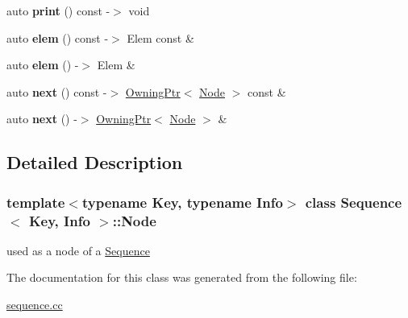 \begin{DoxyCompactItemize}
\item 
\mbox{\label{structSequence_1_1Node_a8db8e48b5cde2ffd9cadb4b89a30d17e}} 
auto {\bfseries print} () const -\/$>$ void
\item 
\mbox{\label{structSequence_1_1Node_a8022d93233587cfd3089f29c3727985b}} 
auto {\bfseries elem} () const -\/$>$ Elem const \&
\item 
\mbox{\label{structSequence_1_1Node_aa22aedfa68f631dde2e577d2e2948623}} 
auto {\bfseries elem} () -\/$>$ Elem \&
\item 
\mbox{\label{structSequence_1_1Node_ade3796b451deec3f5c4f41c294987ecf}} 
auto {\bfseries next} () const -\/$>$ \mbox{\hyperlink{structOwningPtr}{Owning\+Ptr}}$<$ \mbox{\hyperlink{structSequence_1_1Node}{Node}} $>$ const \&
\item 
\mbox{\label{structSequence_1_1Node_a829914bc1971de7e3c793b5118da8c8b}} 
auto {\bfseries next} () -\/$>$ \mbox{\hyperlink{structOwningPtr}{Owning\+Ptr}}$<$ \mbox{\hyperlink{structSequence_1_1Node}{Node}} $>$ \&
\end{DoxyCompactItemize}


\subsection{Detailed Description}
\subsubsection*{template$<$typename Key, typename Info$>$\newline
class Sequence$<$ Key, Info $>$\+::\+Node}

used as a node of a \mbox{\hyperlink{structSequence}{Sequence}} 

The documentation for this class was generated from the following file\+:\begin{DoxyCompactItemize}
\item 
\mbox{\hyperlink{sequence_8cc}{sequence.\+cc}}\end{DoxyCompactItemize}
